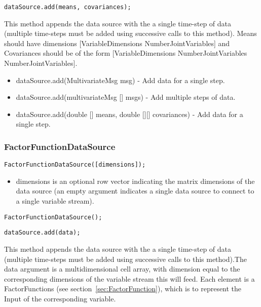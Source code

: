 
\ifmatlab
\begin{lstlisting}
dataSource.add(means, covariances);
\end{lstlisting}

This method appends the data source with the a single time-step of data (multiple time-steps must be added using successive calls to this method).  Means should have dimensions [VariableDimensions NumberJointVariables] and Covariances should be of the form [VariableDimensions NumberJointVariables NumberJointVariables].
\fi

\ifjava
\begin{itemize}
\item dataSource.add(MultivariateMsg msg) - Add data for a single step.
\item dataSource.add(multivariateMsg [] msgs) - Add multiple steps of data.
\item dataSource.add(double [] means, double [][] covariances) - Add data for a single step.
\end{itemize}
\fi


\subsubsection{FactorFunctionDataSource}


\ifmatlab
\begin{lstlisting}
FactorFunctionDataSource([dimensions]);
\end{lstlisting}

\begin{itemize}
\item dimensions is an optional row vector indicating the matrix dimensions of the data source (an empty argument indicates a single data source to connect to a single variable stream).
\end{itemize}
\fi

\ifjava
\begin{lstlisting}
FactorFunctionDataSource();
\end{lstlisting}
\fi




\begin{lstlisting}
dataSource.add(data);
\end{lstlisting}

This method appends the data source with the a single time-step of data (multiple time-steps must be added using successive calls to this method).The data argument is a multidimensional \ifmatlab cell \fi array, with dimension equal to the corresponding dimensions of the variable stream this will feed.  Each element is a FactorFunctions (see section~\ref{sec:FactorFunction}), which is to represent the Input of the corresponding variable.



